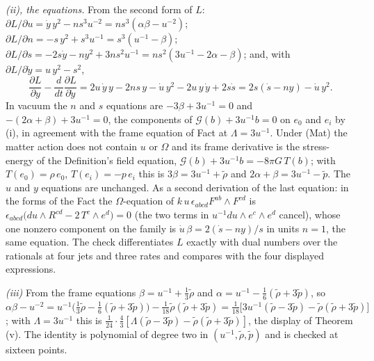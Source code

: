 \emph{(ii), the equations.} From the second form of $L$: $\partial L/\partial u = \dot y\,y^{2} - n s^{3}u^{-2} = n s^{3}(\alpha\beta - u^{-2})$; $\partial L/\partial n = -s\,y^{2} + s^{3}u^{-1} = s^{3}(u^{-1} - \beta)$; $\partial L/\partial s = -2s\dot y - n y^{2} + 3n s^{2}u^{-1} = n s^{2}(3u^{-1} - 2\alpha - \beta)$; and, with $\partial L/\partial\dot y = u\,y^{2} - s^{2}$,
\[
\frac{\partial L}{\partial y} - \frac{d}{dt}\frac{\partial L}{\partial\dot y} = 2u\,\dot y\,y - 2n s\,y - \dot u\,y^{2} - 2u\,y\,\dot y + 2s\dot s = 2s(\dot s - n y) - \dot u\,y^{2}.
\]
In vacuum the $n$ and $s$ equations are $-3\beta + 3u^{-1} = 0$ and $-(2\alpha + \beta) + 3u^{-1} = 0$, the components of $\mathcal{G}(b) + 3u^{-1}b = 0$ on $e_{0}$ and $e_{i}$ by (i), in agreement with the frame equation of Fact  at $\Lambda = 3u^{-1}$. Under (Mat) the matter action does not contain $u$ or $\Omega$ and its frame derivative is the stress-energy of the Definition's field equation, $\mathcal{G}(b) + 3u^{-1}b = -8\pi G\,T(b)$; with $T(e_{0}) = \rho\,e_{0}$, $T(e_{i}) = -p\,e_{i}$ this is $3\beta = 3u^{-1} + \tilde\rho$ and $2\alpha + \beta = 3u^{-1} - \tilde p$. The $u$ and $y$ equations are unchanged. As a second derivation of the last equation: in the forms of the Fact the $\Omega$-equation of $k\,u\,\epsilon_{abcd}F^{ab} \wedge F^{cd}$ is $\epsilon_{abcd}\bigl(du \wedge R^{cd} - 2\,T^{c} \wedge e^{d}\bigr) = 0$ (the two terms in $u^{-1}du \wedge e^{c} \wedge e^{d}$ cancel), whose one nonzero component on the family is $\dot u\,\beta = 2(\dot s - n y)/s$ in units $n = 1$, the same equation. The check differentiates $L$ exactly with dual numbers over the rationals at four jets and three rates and compares with the four displayed expressions.

\emph{(iii)} From the frame equations $\beta = u^{-1} + \tfrac13\tilde\rho$ and $\alpha = u^{-1} - \tfrac16(\tilde\rho + 3\tilde p)$, so $\alpha\beta - u^{-2} = u^{-1}\bigl(\tfrac13\tilde\rho - \tfrac16(\tilde\rho + 3\tilde p)\bigr) - \tfrac1{18}\tilde\rho(\tilde\rho + 3\tilde p) = \tfrac1{18}\bigl[3u^{-1}(\tilde\rho - 3\tilde p) - \tilde\rho(\tilde\rho + 3\tilde p)\bigr]$; with $\Lambda = 3u^{-1}$ this is $\tfrac{1}{24}\cdot\tfrac43[\Lambda(\tilde\rho - 3\tilde p) - \tilde\rho(\tilde\rho + 3\tilde p)]$, the display of Theorem (v). The identity is polynomial of degree two in $(u^{-1}, \tilde\rho, \tilde p)$ and is checked at sixteen points.

